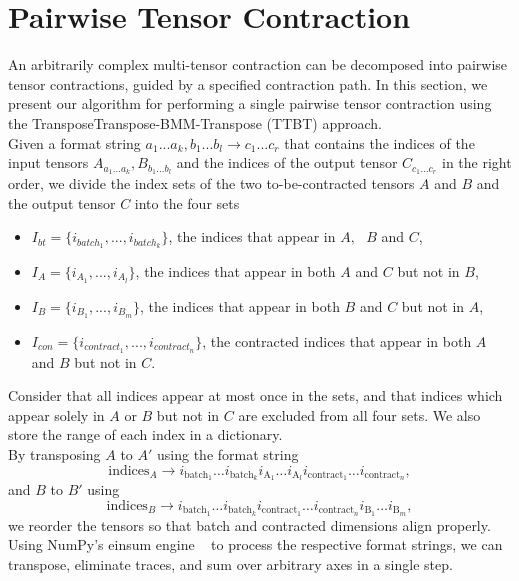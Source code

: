 \section{Pairwise Tensor Contraction}
An arbitrarily complex multi-tensor contraction can be decomposed into pairwise tensor contractions, guided by a specified
contraction path. In this section, we present our algorithm for performing a single pairwise tensor contraction using the TransposeTranspose-BMM-Transpose (TTBT) approach.\\

\noindent Given a format string $a_1...a_k,b_1...b_l\rightarrow c_1...c_r$ that contains the indices of the input tensors $A_{a_1...a_k},B_{b_1...b_l}$ and the indices of the output tensor $C_{c_1...c_r}$ in the right order, we divide the index sets of the two to-be-contracted tensors $A$ and $B$ and the output tensor $C$ into the four sets
\begin{itemize}
    \item $I_{bt}= \{i_{{batch}_1},...,i_{{batch}_k}\}$, the indices that appear in $A, \text{ }B$ and $C$,
    \item $I_A=\{i_{{A}_1}, ...,i_{{A}_l}\}$, the indices that appear in both $A$ and $C$ but not in $B$,
    \item $I_B= \{i_{B_1} ,...,i_{B_m}\}$, the indices that appear in both $B$ and $C$ but not in $A$,
    \item $I_{con} = \{ i_{{contract}_1}, ..., i_{{contract}_n}\}$, the contracted indices that appear in both $A$ and $B$ but not in $C$.
\end{itemize}
Consider that all indices appear at most once in the sets, and that indices which appear solely in $A$ or $B$ but not in $C$ are excluded from all four sets. We also store the range of each index in a dictionary.\\
By transposing $A$ to $A'$ using the format string  
$$\text{indices}_A \rightarrow i_{\text{batch}_1} \dots i_{\text{batch}_k} i_{\text{A}_1} \dots i_{\text{A}_l} i_{\text{contract}_1} \dots i_{\text{contract}_n},$$
and $B$ to $B'$ using  
$$\text{indices}_B \rightarrow i_{\text{batch}_1} \dots i_{\text{batch}_k} i_{\text{contract}_1} \dots i_{\text{contract}_n} i_{\text{B}_1} \dots i_{\text{B}_m},$$
\noindent we reorder the tensors so that batch and contracted dimensions align properly. Using NumPy’s einsum engine ~\cite{Numpy} to process the respective format strings, we can transpose, eliminate traces, and sum over arbitrary axes in a single step.  \\
